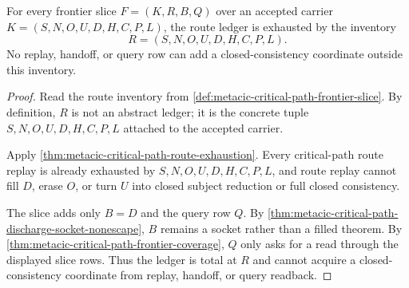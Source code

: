 \begin{theorem}
\label{thm:metacic-critical-path-route-ledger-totality}
For every frontier slice $F=(K,R,B,Q)$ over an accepted carrier $K=(S,N,O,U,D,H,C,P,L)$, the route ledger is exhausted by the inventory
$$
R=(S,N,O,U,D,H,C,P,L).
$$
No replay, handoff, or query row can add a closed-consistency coordinate outside this inventory.
\end{theorem}
\begin{proof}
Read the route inventory from \autoref{def:metacic-critical-path-frontier-slice}. By definition, $R$ is not an abstract ledger; it is the concrete tuple $S,N,O,U,D,H,C,P,L$ attached to the accepted carrier.

Apply \autoref{thm:metacic-critical-path-route-exhaustion}. Every critical-path route replay is already exhausted by $S,N,O,U,D,H,C,P,L$, and route replay cannot fill $D$, erase $O$, or turn $U$ into closed subject reduction or full closed consistency.

The slice adds only $B=D$ and the query row $Q$. By \autoref{thm:metacic-critical-path-discharge-socket-nonescape}, $B$ remains a socket rather than a filled theorem. By \autoref{thm:metacic-critical-path-frontier-coverage}, $Q$ only asks for a read through the displayed slice rows. Thus the ledger is total at $R$ and cannot acquire a closed-consistency coordinate from replay, handoff, or query readback.
\end{proof}

